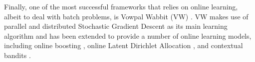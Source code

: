Finally, one of the most successful frameworks that relies on online learning,
albeit to deal with batch problems, is Vowpal Wabbit (VW) \cite{vw}. VW makes
use of parallel and distributed Stochastic Gradient Descent \cite{sgd} as its main
learning algorithm and has been extended to provide a number of online learning models,
including online boosting \cite{Beygelzimer2015optimal}, online Latent Dirichlet Allocation
\cite{ldaOnline}, and contextual bandits \cite{onlineBandits}.
